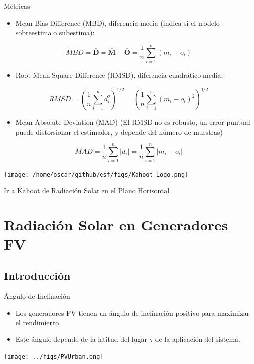 \documentclass[xcolor={usenames,svgnames,dvipsnames}]{beamer}
\begin{document}
\begin{frame}[label={sec:orgea16188}]{Métricas}
\begin{itemize}
\item \alert{Mean Bias Difference (MBD)}, diferencia media (indica si el modelo sobreestima o subestima):
\end{itemize}
\[
MBD = \overline{\mathbf{D}} = \overline{\mathbf{M}} - \overline{\mathbf{O}} = \frac{1}{n} \sum_{i=1}^n (m_i - o_i)
\]

\begin{itemize}
\item \alert{Root Mean Square Difference (RMSD)}, diferencia cuadrático media:
\end{itemize}
\[
RMSD = \left(\frac{1}{n} \sum_{i=1}^n d_i^2 \right)^{1/2} =  \left( \frac{1}{n} \sum_{i=1}^n (m_i - o_i)^2  \right)^{1/2}
\]

\begin{itemize}
\item \alert{Mean Absolute Deviation (MAD)} (El RMSD no es robusto, un error puntual puede distorsionar el estimador, y depende del número de muestras)
\end{itemize}

\[
MAD = \frac{1}{n} \sum_{i=1}^n \left|d_i\right| =  \frac{1}{n} \sum_{i=1}^n \left|m_i - o_i\right|
\]
\end{frame}
\begin{frame}[label={sec:org36190a8}]{}
\begin{center}
\texttt{[image: /home/oscar/github/esf/figs/Kahoot\_Logo.png]}
\end{center}

\href{https://play.kahoot.it/v2/?quizId=62ee25e6-4056-4321-b95c-7af71b3fb069}{Ir a Kahoot de Radiación Solar en el Plano Horizontal}
\end{frame}

\section{Radiación Solar en Generadores FV}
\label{sec:orgcbbf0c6}

\subsection{Introducción}
\label{sec:org614d7f4}

\begin{frame}[label={sec:orgfc1be72}]{Ángulo de Inclinación}
\begin{itemize}
\item Los generadores FV tienen un ángulo de inclinación positivo para maximizar el rendimiento.
\item Este ángulo depende de la latitud del lugar y de la aplicación del sistema.
\end{itemize}

\begin{center}
\texttt{[image: ../figs/PVUrban.png]}
\end{center}
\end{frame}
\end{document}
